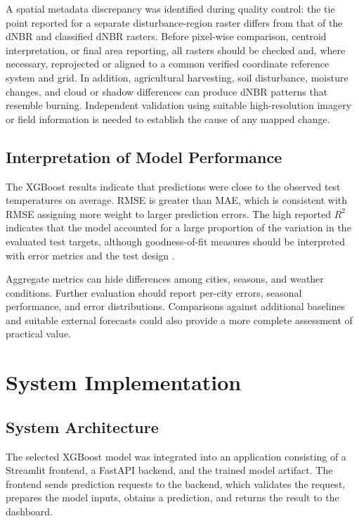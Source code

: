 \documentclass[12pt,a4paper]{article}
\begin{document}
	A spatial metadata discrepancy was identified during quality control:
	the tie point reported for a separate disturbance-region raster differs
	from that of the dNBR and classified dNBR rasters. Before pixel-wise
	comparison, centroid interpretation, or final area reporting, all
	rasters should be checked and, where necessary, reprojected or aligned
	to a common verified coordinate reference system and grid. In addition,	agricultural harvesting, soil disturbance, moisture changes, and cloud or
	shadow differences can produce dNBR patterns that resemble burning.
	Independent validation using suitable high-resolution imagery or field
	information is needed to establish the cause of any mapped change.
	
	\FloatBarrier
	
	\subsection{Interpretation of Model Performance}
	
	The XGBoost results indicate that predictions were close to the
	observed test temperatures on average. RMSE is greater than MAE,
	which is consistent with RMSE assigning more weight to larger
	prediction errors. The high reported $R^2$ indicates that the model
	accounted for a large proportion of the variation in the evaluated
	test targets, although goodness-of-fit measures should be interpreted
	with error metrics and the test design \cite{gneiting2011,jolliffe2012}.
	
	Aggregate metrics can hide differences among cities, seasons, and
	weather conditions. Further evaluation should report per-city
	errors, seasonal performance, and error distributions. Comparisons
	against additional baselines and suitable external forecasts could
	also provide a more complete assessment of practical value.
	
	\section{System Implementation}
	
	\subsection{System Architecture}
	
	The selected XGBoost model was integrated into an application
	consisting of a Streamlit frontend, a FastAPI backend, and the
	trained model artifact. The frontend sends prediction requests to
	the backend, which validates the request, prepares the model inputs,
	obtains a prediction, and returns the result to the dashboard.
	
\end{document}

